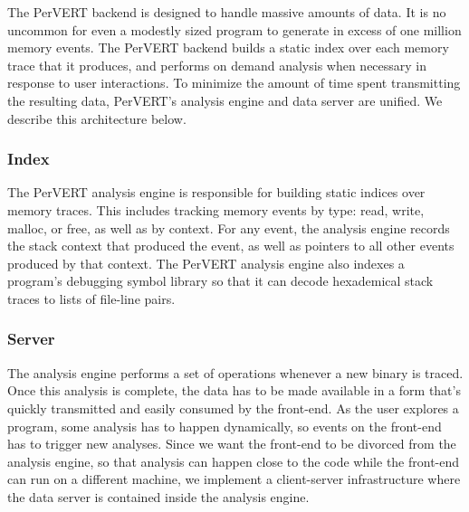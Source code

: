 \documentclass[annual]{acmsiggraph}
\begin{document}
    The PerVERT backend is designed to handle massive amounts of data.
    It is no uncommon for even a modestly sized program to generate in excess of one million memory events.
    The PerVERT backend builds a static index over each memory trace that it produces, 
      and performs on demand analysis when necessary in response to user interactions.
    To minimize the amount of time spent transmitting the resulting data, 
      PerVERT's analysis engine and data server are unified.
    We describe this architecture below.

    \subsubsection{Index}

      The PerVERT analysis engine is responsible for building static indices over memory traces.
      This includes tracking memory events by type: read, write, malloc, or free,
        as well as by context.
      For any event, the analysis engine records the stack context that produced the event, 
        as well as pointers to all other events produced by that context.       
      The PerVERT analysis engine also indexes a program's debugging symbol library so that it can decode
        hexademical stack traces to lists of file-line pairs.


    \subsubsection{Server}
      The analysis engine performs a set of operations whenever a new binary is traced. Once this analysis is complete, the data has to be made available in a form that's quickly transmitted and easily consumed by the front-end. As the user explores a program, some analysis has to happen dynamically, so events on the front-end has to trigger new analyses. Since we want the front-end to be divorced from the analysis engine, so that analysis can happen close to the code while the front-end can run on a different machine, we implement a client-server infrastructure where the data server is contained inside the analysis engine.
      
\end{document}
